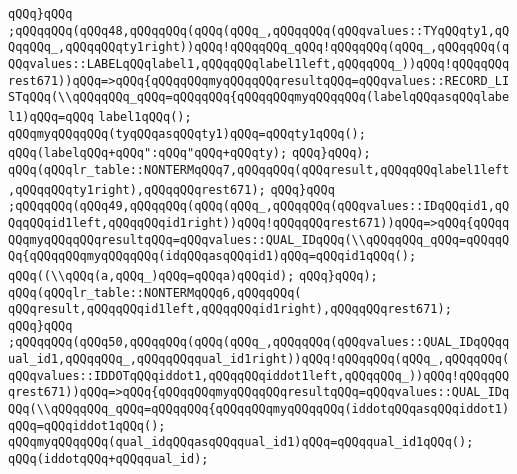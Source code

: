 \verb|qQQq}qQQq|\newline
\verb|;qQQqqQQq(qQQq48,qQQqqQQq(qQQq(qQQq_,qQQqqQQq(qQQqvalues::TYqQQqty1,qQQqqQQq_,qQQqqQQqty1right))qQQq!qQQqqQQq_qQQq!qQQqqQQq(qQQq_,qQQqqQQq(qQQqvalues::LABELqQQqlabel1,qQQqqQQqlabel1left,qQQqqQQq_))qQQq!qQQqqQQqrest671))qQQq=>qQQq{qQQqqQQqmyqQQqqQQqresultqQQq=qQQqvalues::RECORD_LISTqQQq(\\qQQqqQQq_qQQq=qQQqqQQq{qQQqqQQqmyqQQqqQQq(labelqQQqasqQQqlabel1)qQQq=qQQq|\newline
\verb|label1qQQq();|\newline
\verb|qQQqmyqQQqqQQq(tyqQQqasqQQqty1)qQQq=qQQqty1qQQq();|\newline
\verb|qQQq(labelqQQq+qQQq":qQQq"qQQq+qQQqty);|\newline
\verb|qQQq}qQQq);|\newline
\verb|qQQq(qQQqlr_table::NONTERMqQQq7,qQQqqQQq(qQQqresult,qQQqqQQqlabel1left,qQQqqQQqty1right),qQQqqQQqrest671);|\newline
\verb|qQQq}qQQq|\newline
\verb|;qQQqqQQq(qQQq49,qQQqqQQq(qQQq(qQQq_,qQQqqQQq(qQQqvalues::IDqQQqid1,qQQqqQQqid1left,qQQqqQQqid1right))qQQq!qQQqqQQqrest671))qQQq=>qQQq{qQQqqQQqmyqQQqqQQqresultqQQq=qQQqvalues::QUAL_IDqQQq(\\qQQqqQQq_qQQq=qQQqqQQq{qQQqqQQqmyqQQqqQQq(idqQQqasqQQqid1)qQQq=qQQqid1qQQq();|\newline
\verb|qQQq((\\qQQq(a,qQQq_)qQQq=qQQqa)qQQqid);|\newline
\verb|qQQq}qQQq);|\newline
\verb|qQQq(qQQqlr_table::NONTERMqQQq6,qQQqqQQq(|\newline
\verb|qQQqresult,qQQqqQQqid1left,qQQqqQQqid1right),qQQqqQQqrest671);|\newline
\verb|qQQq}qQQq|\newline
\verb|;qQQqqQQq(qQQq50,qQQqqQQq(qQQq(qQQq_,qQQqqQQq(qQQqvalues::QUAL_IDqQQqqual_id1,qQQqqQQq_,qQQqqQQqqual_id1right))qQQq!qQQqqQQq(qQQq_,qQQqqQQq(qQQqvalues::IDDOTqQQqiddot1,qQQqqQQqiddot1left,qQQqqQQq_))qQQq!qQQqqQQqrest671))qQQq=>qQQq{qQQqqQQqmyqQQqqQQqresultqQQq=qQQqvalues::QUAL_IDqQQq(\\qQQqqQQq_qQQq=qQQqqQQq{qQQqqQQqmyqQQqqQQq(iddotqQQqasqQQqiddot1)|\newline
\verb|qQQq=qQQqiddot1qQQq();|\newline
\verb|qQQqmyqQQqqQQq(qual_idqQQqasqQQqqual_id1)qQQq=qQQqqual_id1qQQq();|\newline
\verb|qQQq(iddotqQQq+qQQqqual_id);|\newline

